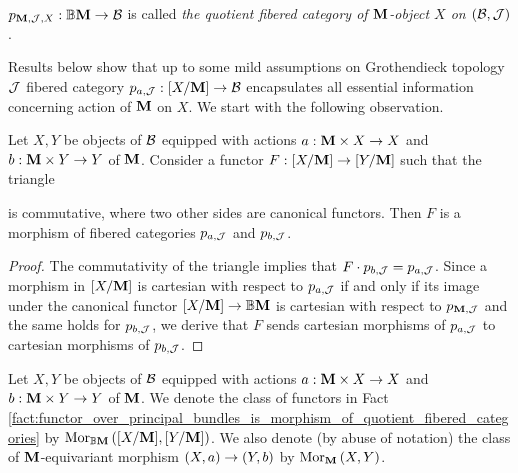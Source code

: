 \begin{definition}
$p_{\mathbf{M},{\mathcal J},X}:\mathbb{B}\mathbf{M}\rightarrow {\mathcal B}$ is called \textit{the quotient fibered category of $\mathbf{M}$-object $X$ on $({\mathcal B},{\mathcal J})$}.
\end{definition}
\noindent
Results below show that up to some mild assumptions on Grothendieck topology ${\mathcal J}$ fibered category $p_{a,{\mathcal J}}:[X/\mathbf{M}]\rightarrow {\mathcal B}$ encapsulates all essential information concerning action of $\mathbf{M}$ on $X$. We start with the following observation.

\begin{fact}\label{fact:functor_over_principal_bundles_is_morphism_of_quotient_fibered_categories}
Let $X,Y$ be objects of ${\mathcal B}$ equipped with actions $a:\mathbf{M}\times X\rightarrow X$ and $b:\mathbf{M}\times Y\rightarrow Y$ of $\mathbf{M}$. Consider a functor $F:[X/\mathbf{M}]\rightarrow [Y/\mathbf{M}]$ such that the triangle
\begin{center}
\end{center}
is commutative, where two other sides are canonical functors. Then $F$ is a morphism of fibered categories $p_{a,{\mathcal J}}$ and $p_{b,{\mathcal J}}$.
\end{fact}
\begin{proof}
The commutativity of the triangle implies that $F\cdot p_{b,{\mathcal J}} = p_{a,{\mathcal J}}$. Since a morphism in $[X/\mathbf{M}]$ is cartesian with respect to $p_{a,{\mathcal J}}$ if and only if its image under the canonical functor $[X/\mathbf{M}]\rightarrow \mathbb{B}\mathbf{M}$ is cartesian with respect to $p_{\mathbf{M},{\mathcal J}}$ and the same holds for $p_{b,{\mathcal J}}$, we derive that $F$ sends cartesian morphisms of $p_{a,{\mathcal J}}$ to cartesian morphisms of $p_{b,{\mathcal J}}$. 
\end{proof}
\noindent
Let $X,Y$ be objects of ${\mathcal B}$ equipped with actions $a:\mathbf{M}\times X\rightarrow X$ and $b:\mathbf{M}\times Y\rightarrow Y$ of $\mathbf{M}$. We denote the class of functors in Fact \ref{fact:functor_over_principal_bundles_is_morphism_of_quotient_fibered_categories} by $\mathrm{Mor}_{\mathbb{B}\mathbf{M}}\left([X/\mathbf{M}],[Y/\mathbf{M}]\right)$. We also denote (by abuse of notation) the class of $\mathbf{M}$-equivariant morphism $(X,a)\rightarrow (Y,b)$ by $\mathrm{Mor}_{\mathbf{M}}\left(X,Y\right)$.


